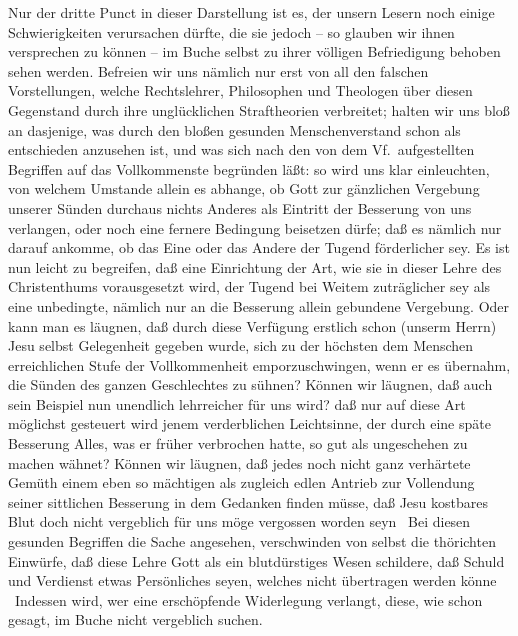 Nur der dritte Punct in dieser Darstellung ist es, der unsern Lesern noch einige Schwierigkeiten verursachen dürfte, die sie jedoch -- so glauben wir ihnen versprechen zu können -- im Buche selbst zu ihrer völligen Befriedigung behoben sehen werden. Befreien wir uns nämlich nur erst von all den  falschen Vorstellungen, welche Rechtslehrer, Philosophen und Theologen über diesen Gegenstand durch ihre unglücklichen Straftheorien verbreitet; halten wir uns bloß an dasjenige, was durch den bloßen gesunden Menschenverstand schon als entschieden anzusehen ist, und was sich nach den von dem Vf.\ aufgestellten Begriffen auf das Vollkommenste begründen läßt: so wird uns klar einleuchten, von welchem Umstande allein es abhange, ob Gott zur gänzlichen Vergebung unserer Sünden durchaus nichts Anderes als Eintritt der Besserung von uns verlangen, oder noch eine fernere Bedingung beisetzen dürfe; daß es nämlich nur darauf ankomme, ob das Eine oder das Andere der Tugend förderlicher sey. Es ist nun leicht zu begreifen, daß eine Einrichtung der Art, wie sie in dieser Lehre des Christenthums vorausgesetzt wird, der Tugend bei Weitem zuträglicher sey als eine unbedingte, nämlich nur an die Besserung allein gebundene Vergebung. Oder kann man es läugnen, daß durch diese Verfügung erstlich schon (unserm Herrn) Jesu selbst Gelegenheit gegeben wurde, sich zu der höchsten dem Menschen erreichlichen Stufe der Vollkommenheit emporzuschwingen, wenn er es übernahm, die Sünden des ganzen Geschlechtes zu sühnen? Können wir läugnen, daß auch sein Beispiel nun unendlich lehrreicher für uns wird? daß nur auf diese Art möglichst gesteuert wird jenem verderblichen Leichtsinne, der durch eine späte Besserung Alles, was er früher verbrochen hatte, so gut als ungeschehen zu machen wähnet? Können wir läugnen, daß jedes noch nicht ganz verhärtete Gemüth einem eben so mächtigen als zugleich edlen Antrieb zur Vollendung seiner sittlichen Besserung in dem Gedanken finden müsse, daß Jesu kostbares Blut doch nicht vergeblich für uns möge vergossen worden seyn \umA\ Bei diesen gesunden Begriffen die Sache angesehen, verschwinden von selbst die thörichten Einwürfe, daß diese Lehre Gott als ein blutdürstiges Wesen schildere, daß Schuld und Verdienst etwas Persönliches seyen, welches nicht übertragen werden könne \usw\ Indessen wird, wer eine erschöpfende Widerlegung verlangt, diese, wie schon gesagt, im Buche nicht vergeblich suchen. \par
